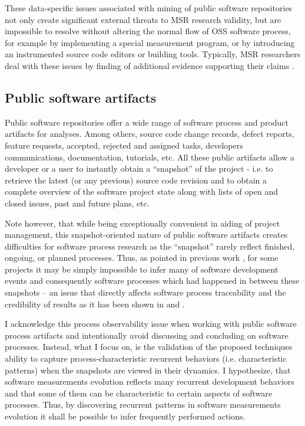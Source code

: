 These data-specific issues associated with mining of public software repositories not only create significant external threats 
to MSR research validity, but are impossible to resolve without altering the normal flow of OSS software process, 
for example by implementing a special measurement program, or by introducing an instrumented source code editors or 
building tools. Typically, MSR researchers deal with these issues by finding of additional evidence supporting their claims 
\cite{citeulike:5043664} \cite{citeulike:5128808}.

\subsection{Public software artifacts}
Public software repositories offer a wide range of software process and product artifacts for analyses.
Among others, source code change records, defect reports, feature requests, accepted, rejected and assigned tasks, 
developers communications, documentation, tutorials, etc. 
All these public artifacts allow a developer or a user to instantly obtain a ``snapshot'' of the project - 
i.e. to retrieve the latest (or any previous) source code revision and to obtain a complete overview of the software 
project state along with lists of open and closed issues, past and future plans, etc.

Note however, that while being exceptionally convenient in aiding of project management, this snapshot-oriented nature 
of public software artifacts creates difficulties for software process research as the ``snapshot'' rarely reflect finished, 
ongoing, or planned processes. 
Thus, as pointed in previous work \cite{citeulike:1296888}, for some projects it may be simply impossible to infer 
many of software development events and consequently software processes which had happened in between these 
snapshots -- an issue that directly affects software process traceability and the credibility of results as it has been shown in 
\cite{citeulike:2280690} and \cite{citeulike:9037939}. 

I acknowledge this process observability issue when working with public software process artifacts and intentionally avoid 
discussing and concluding on software processes. Instead, what I focus on, is the validation of the proposed techniques 
ability to capture process-characteristic recurrent behaviors (i.e. characteristic patterns) when the snapshots are 
viewed in their dynamics. 
I hypothesize, that software measurements evolution reflects many recurrent development behaviors and that some of 
them can be characteristic to certain aspects of software processes. 
Thus, by discovering recurrent patterns in software measurements evolution it shall be possible to infer frequently 
performed actions.


